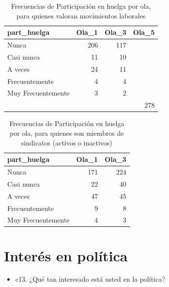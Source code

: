 \documentclass[
  12pt,
]{book}
\providecommand{\tightlist}{%
  \setlength{\itemsep}{0pt}\setlength{\parskip}{0pt}}
\begin{document}
\begin{table}

\caption{\label{tab:unnamed-chunk-25}Frecuencias de Participación en huelga por ola, para quienes valoran movimientos laborales}
\centering
\begin{tabular}[t]{l|r|r|r}
\hline
part\_huelga & Ola\_1 & Ola\_3 & Ola\_5\\
\hline
Nunca & 206 & 117 & \\
\hline
Casi nunca & 11 & 10 & \\
\hline
A veces & 24 & 11 & \\
\hline
Frecuentemente & 4 & 4 & \\
\hline
Muy Frecuentemente & 3 & 2 & \\
\hline
 &  &  & 278\\
\hline
\end{tabular}
\end{table}

\begin{table}

\caption{\label{tab:unnamed-chunk-26}Frecuencias de Participación en huelga por ola, para quienes son miembros de sindicatos (activos o inactivos)}
\centering
\begin{tabular}[t]{l|r|r}
\hline
part\_huelga & Ola\_1 & Ola\_3\\
\hline
Nunca & 171 & 224\\
\hline
Casi nunca & 22 & 40\\
\hline
A veces & 47 & 45\\
\hline
Frecuentemente & 9 & 8\\
\hline
Muy Frecuentemente & 4 & 3\\
\hline
\end{tabular}
\end{table}

\hypertarget{interuxe9s-en-poluxedtica}{%
\section{Interés en política}\label{interuxe9s-en-poluxedtica}}

\begin{itemize}
\tightlist
\item
  c13. ¿Qué tan interesado está usted en la política?
\end{itemize}
\end{document}

